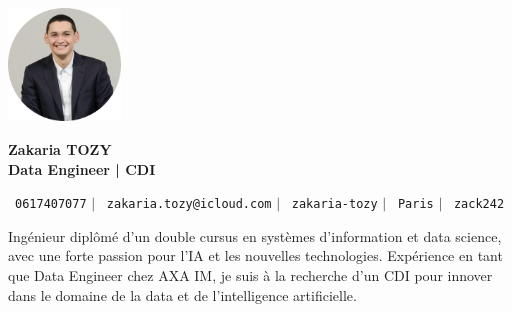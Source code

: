 \documentclass[11pt,a4paper]{article}
\begin{document}
\begin{flushleft}
  \begin{minipage}[c]{0.2\textwidth}
    \includegraphics[width=3cm]{images/profilpicture.png}
  \end{minipage}%
  \begin{minipage}[c]{0.8\textwidth}
    {\Huge \textbf{Zakaria TOZY}} \\[5pt]
    {\Large \textbf{Data Engineer | CDI}}
  \end{minipage}
\end{flushleft}

\vspace{-5pt}

\begin{center}
    \small \faPhone\ \texttt{0617407077} \hspace{1pt} $|$
    \hspace{1pt} \faEnvelope\ \texttt{zakaria.tozy@icloud.com} \hspace{1pt} $|$
    \hspace{1pt} \faLinkedin\ \texttt{zakaria-tozy} \hspace{1pt} $|$
    \hspace{1pt} \faMapMarker\ \texttt{Paris} \hspace{1pt} $|$
    \hspace{1pt} \faGithub\ \texttt{zack242} \\ \vspace{0pt}
\end{center}

\begin{itemize}[leftmargin=0in, label={}]
\footnotesize{\item{
Ingénieur diplômé d'un double cursus en systèmes d'information et data science, avec une forte passion pour l'IA et les nouvelles technologies. Expérience en tant que Data Engineer chez AXA IM, je suis à la recherche d'un CDI pour innover dans le domaine de la data et de l'intelligence artificielle.
}}
\end{itemize}
\end{document}
